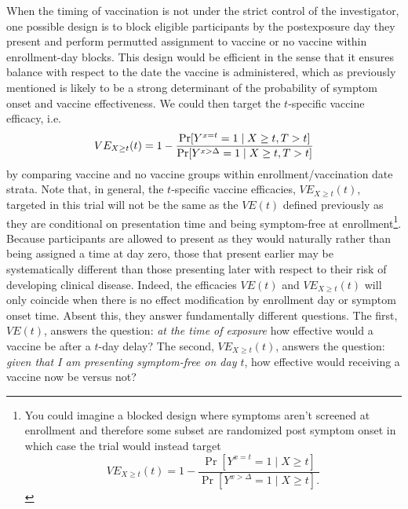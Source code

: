 \documentclass[11pt]{article}
\begin{document}
When the timing of vaccination is not under the strict control of the investigator, one possible design is to block eligible participants by the postexposure day they present and perform permutted assignment to vaccine or no vaccine within enrollment-day blocks. This design would be efficient in the sense that it ensures balance with respect to the date the vaccine is administered, which as previously mentioned is likely to be a strong determinant of the probability of symptom onset and vaccine effectiveness. We could then target the $t$-specific vaccine efficacy, i.e.
$$
VE_{X \geq t}(t) = 1 - \frac{\Pr[Y^{x = t} = 1 \mid X \geq t, T > t]}{\Pr[Y^{x > \Delta} = 1 \mid X \geq t, T > t]} \\
$$
by comparing vaccine and no vaccine groups within enrollment/vaccination date strata. Note that, in general, the $t$-specific vaccine efficacies, $VE_{X \geq t}(t)$, targeted in this trial will not be the same as the $VE(t)$ defined previously as they are conditional on presentation time and being symptom-free at enrollment\footnote{You could imagine a blocked design where symptoms aren't screened at enrollment and therefore some subset are randomized post symptom onset in which case the trial would instead target $$VE_{X \geq t}(t) = 1 - \frac{\Pr[Y^{x = t} = 1 \mid X \geq t]}{\Pr[Y^{x > \Delta} = 1 \mid X \geq t].}$$}. Because participants are allowed to present as they would naturally rather than being assigned a time at day zero, those that present earlier may be systematically different than those presenting later with respect to their risk of developing clinical disease. Indeed, the efficacies $VE(t)$ and $VE_{X \geq t}(t)$ will only coincide when there is no effect modification by enrollment day or symptom onset time. Absent this, they answer fundamentally different questions. The first, $VE(t)$, answers the question: \textit{at the time of exposure} how effective would a vaccine be after a $t$-day delay? The second, $VE_{X \geq t}(t)$, answers the question: \textit{given that I am presenting symptom-free on day $t$}, how effective would receiving a vaccine now be versus not? 


\end{document}
